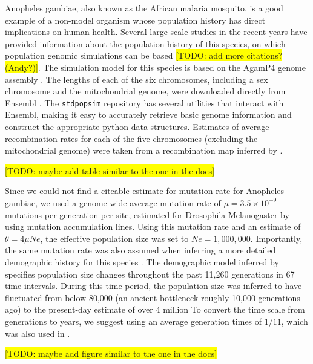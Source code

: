 \documentclass{article}
\newcommand{\stdpopsim}{\texttt{stdpopsim}\xspace}
\begin{document}
Anopheles gambiae, also known as the African malaria mosquito, is a good example of a non-model organism whose population history has direct implications on human health. Several large scale studies in the recent years have provided information about the population history of this species, on which population genomic simulations can be based \citep{Pombi2006,Miles2017} \colorbox{yellow}{[TODO: add more citations? (Andy?)]}. The simulation model for this species is based on the AgamP4 genome assembly \citep{Sharakhova2007}. The lengths of each of the six chromosomes, including a sex chromosome and the mitochondrial genome, were downloaded directly from Ensembl \citep{ensembl2021}.
The \texttt{\stdpopsim} repository has several utilities that interact with Ensembl, making it easy to accurately retrieve basic genome information and construct the appropriate python data structures.
%
%
Estimates of average recombination rates for each of the five chromosomes (excluding the mitochondrial genome) were taken from a recombination map inferred by \cite{Pombi2006}.
%

\colorbox{yellow}{[TODO:  maybe add table similar to the one in the docs]} 

Since we could not find a citeable estimate for mutation rate for Anopheles gambiae, we used a genome-wide average mutation rate of $\mu=3.5 \times 10^{-9}$ mutations per generation per site, estimated for Drosophila Melanogaster by \cite{Keightley2009} using mutation accumulation lines. Using this mutation rate and an estimate of $\theta=4\mu Ne$, the effective population size was set to $Ne=1,000,000$.
%
Importantly, the same mutation rate was also assumed when inferring a more detailed demographic history for this species \citep{Miles2017}. The demographic model inferred by \cite{Miles2017} specifies population size changes throughout the past 11,260 generations in 67 time intervals. During this time period, the population size was inferred to have fluctuated from below 80,000 (an ancient bottleneck roughly 10,000 generations ago) to the present-day estimate of over 4 million %
To convert the time scale from generations to years, we suggest using an average generation times of $1/11$, which was also used in \citep{Miles2017}.

\colorbox{yellow}{[TODO:  maybe add figure similar to the one in the docs]} 
\end{document}
